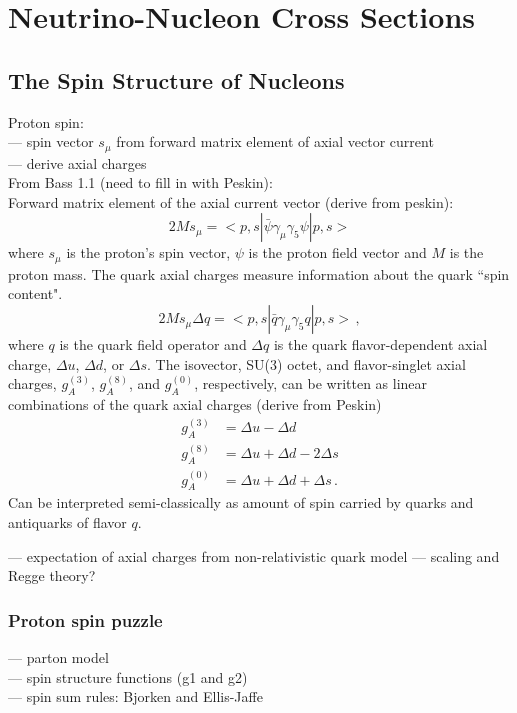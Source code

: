 \section{Neutrino-Nucleon Cross Sections} \label{theory}
\hspace{\parindent}

\subsection{The Spin Structure of Nucleons}
  Proton spin: \\
  --- spin vector $s_{\mu}$ from forward matrix element of axial vector current \\
  --- derive axial charges \\
  From Bass 1.1 (need to fill in with Peskin): \\
  Forward matrix element of the axial current vector (derive from peskin):
  \[
      2Ms_{\mu} = <p,s|\bar{\psi}\gamma_{\mu} \gamma_{5} \psi|p,s>
  \]
  where $s_{\mu}$ is the proton's spin vector, $\psi$ is the proton field
  vector and $M$ is the proton mass. The quark axial charges measure
  information about the quark ``spin content".
  \[
    2Ms_{\mu}\Delta q = <p,s| \bar{q}\gamma_{\mu}\gamma_{5}q|p,s> \,,
  \]
  where $q$ is the quark field operator and $\Delta q$ is the quark
  flavor-dependent axial charge, $\Delta u$, $\Delta d$, or $\Delta s$. The
  isovector, SU(3) octet, and flavor-singlet axial charges, $g_A^{(3)}$,
  $g_A^{(8)}$, and $g_A^{(0)}$, respectively, can be written as linear
  combinations of the quark axial charges (derive from Peskin)
  \begin{align}
      g_A^{(3)} &= \Delta u - \Delta d \\
      g_A^{(8)} &= \Delta u + \Delta d - 2\Delta s \\
      g_A^{(0)} &= \Delta u + \Delta d + \Delta s \,.
  \end{align}
  Can be interpreted semi-classically as amount of spin carried by quarks and
  antiquarks of flavor $q$.


  --- expectation of axial charges from non-relativistic quark model
  --- scaling and Regge theory?
  \subsubsection{Proton spin puzzle}
    --- parton model \\
    --- spin structure functions (g1 and g2) \\
    --- spin sum rules: Bjorken and Ellis-Jaffe \\
